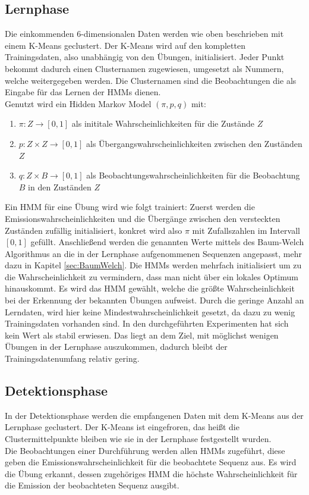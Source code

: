 \documentclass{article}
\begin{document}
\begin{align-*}
\subsection{Lernphase}
Die einkommenden 6-dimensionalen Daten werden wie oben beschrieben mit einem K-Means geclustert.
Der K-Means wird auf den kompletten Trainingsdaten, also unabhängig von den Übungen, initialisiert.
Jeder Punkt bekommt dadurch einen Clusternamen zugewiesen, umgesetzt als Nummern, welche weitergegeben werden.
Die Clusternamen sind die Beobachtungen die als Eingabe für das Lernen der HMMs dienen.\\
Genutzt wird ein Hidden Markov Model $(\pi, p, q)$ mit:
\begin{enumerate}
\item $\pi: Z \rightarrow [0,1]$ als inititale Wahrscheinlichkeiten für die Zustände $Z$
\item $p: Z \times Z \rightarrow [0,1]$ als Übergangswahrscheinlichkeiten zwischen den Zuständen $Z$
\item $q: Z \times B \rightarrow [0,1]$ als Beobachtungswahrscheinlichkeiten für die Beobachtung $B$ in den Zuständen $Z$
\end{enumerate}
Ein HMM für eine Übung wird wie folgt trainiert:
Zuerst werden die Emissionswahrscheinlichkeiten und die Übergänge zwischen den versteckten Zuständen zufällig initialisiert, konkret wird also $\pi$ mit Zufallszahlen im Intervall $[0,1]$ gefüllt.
Anschließend werden die genannten Werte mittels des Baum-Welch Algorithmus an die in der Lernphase aufgenommenen Sequenzen angepasst, mehr dazu in Kapitel \ref{sec:BaumWelch}.
Die HMMs werden mehrfach initialisiert um zu die Wahrscheinlichkeit zu vermindern, dass man nicht über ein lokales Optimum hinauskommt.
Es wird das HMM gewählt, welche die größte Wahrscheinlichkeit bei der Erkennung der bekannten Übungen aufweist.
Durch die geringe Anzahl an Lerndaten, wird hier keine Mindestwahrscheinlichkeit gesetzt, da dazu zu wenig Trainingsdaten vorhanden sind.
In den durchgeführten Experimenten hat sich kein Wert als stabil erwiesen.
Das liegt an dem Ziel, mit möglichst wenigen Übungen in der Lernphase auszukommen, dadurch bleibt der Trainingsdatenumfang relativ gering.

\subsection{Detektionsphase}
In der Detektionsphase werden die empfangenen Daten mit dem K-Means aus der Lernphase geclustert.
Der K-Means ist eingefroren, das heißt die Clustermittelpunkte bleiben wie sie in der Lernphase festgestellt wurden.\\
Die Beobachtungen einer Durchführung werden allen HMMs zugeführt, diese geben die Emissionswahrscheinlichkeit für die beobachtete Sequenz aus.
Es wird die Übung erkannt, dessen zugehöriges HMM die höchste Wahrscheinlichkeit für die Emission der beobachteten Sequenz ausgibt.


\end{align-*}
\end{document}
